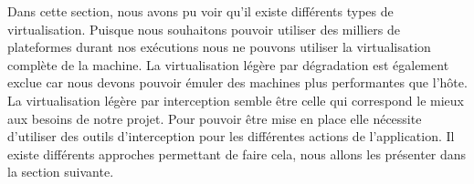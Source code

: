 Dans cette section, nous avons pu voir qu'il existe différents types de virtualisation. Puisque nous souhaitons pouvoir utiliser des milliers de plateformes durant nos exécutions nous ne pouvons utiliser la virtualisation complète de la machine. La virtualisation légère par dégradation est également exclue car nous devons pouvoir émuler des machines plus performantes que l'hôte. La virtualisation légère par interception semble être celle qui correspond le mieux aux besoins de notre projet. Pour pouvoir être mise en place elle nécessite d'utiliser des outils d'interception pour les différentes actions de l'application. Il existe différents approches permettant de faire cela, nous allons les présenter dans la section suivante.
